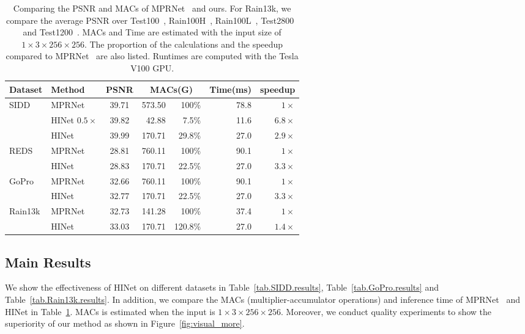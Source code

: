 \documentclass[final]{cvpr}
\newcommand{\tablestyle}[2]{\setlength{\tabcolsep}{#1}\renewcommand{\arraystretch}{#2}\centering\footnotesize}
\begin{document}
\begin{table}
\centering
\tablestyle{5pt}{1.05}\setlength{\tabcolsep}{1.mm}\begin{tabular}{l|l|c|rr|rr}
Dataset& Method & PSNR & \multicolumn{2}{c}{MACs(G)} &Time(ms)&speedup\\
\hline
\multirow{3}{4em}{SIDD~\cite{abdelhamed2018high}} & MPRNet~\cite{Zamir2021MPRNet} & 39.71 & 573.50&100\% & 78.8 & $1\times$\\
&HINet $0.5\times$&39.82&42.88&7.5\% & 11.6 & $6.8\times$\\
&HINet &39.99&170.71&29.8\% & 27.0& $2.9\times$\\
\hline
\multirow{2}{4em}{REDS~\cite{nah2019ntire}} & MPRNet~\cite{Zamir2021MPRNet} & 28.81 & 760.11&100\% & 90.1& $1\times$\\
&HINet  &28.83&170.71&22.5\% & 27.0 & $3.3\times$\\
\hline
\multirow{2}{4em}{GoPro~\cite{nah2017deep}} & MPRNet~\cite{Zamir2021MPRNet} & 32.66 & 760.11&100\% & 90.1 & $1\times$ \\
&HINet  &32.77&170.71&22.5\% & 27.0 & $3.3\times$\\
\hline
\multirow{2}{4em}{Rain13k} & MPRNet~\cite{Zamir2021MPRNet} & 32.73 &141.28&100\% & 37.4 & $1\times$\\
&HINet  &33.03&170.71&120.8\% & 27.0 & $1.4\times$\\
\end{tabular}
\vspace{-.2cm}
\caption{Comparing the PSNR and MACs of MPRNet~\cite{Zamir2021MPRNet} and ours. For Rain13k, we compare the average PSNR over Test100~\cite{zhang2019image}, Rain100H~\cite{yang2017deep}, Rain100L~\cite{yang2017deep}, Test2800~\cite{fu2017removing} and Test1200~\cite{zhang2018density}. MACs and Time are estimated with the input size of $1\times3\times256\times256$. The proportion of the calculations and the speedup compared to MPRNet~\cite{Zamir2021MPRNet} are also listed. Runtimes are computed with the Tesla V100 GPU.}
\label{tab.GmacsCompare}
\vspace{-.3cm}
\end{table}




\subsection{Main Results}
We show the effectiveness of HINet on different datasets in Table~\ref{tab.SIDD.results}, Table~\ref{tab.GoPro.results} and Table~\ref{tab.Rain13k.results}. In addition, we compare the MACs (\ie multiplier-accumulator operations) and inference time of MPRNet~\cite{Zamir2021MPRNet} and HINet in Table~\ref{tab.GmacsCompare}. MACs is estimated when the input is $1\times3\times256\times256$. Moreover, we conduct quality experiments to show the superiority of our method as shown in Figure~\ref{fig:visual_more}.
\end{document}
